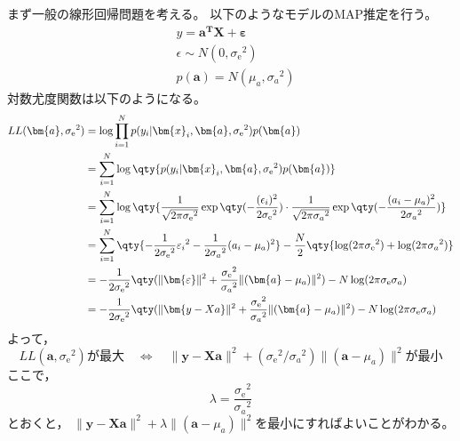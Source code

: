 \documentclass[class=jsarticle, crop=false, dvipdfmx, fleqn]{standalone}
\begin{document}
まず一般の線形回帰問題を考える。
以下のようなモデルのMAP推定を行う。
\begin{align}
& y = \bm{a^T X} + \bm{\varepsilon} \\
& \epsilon \sim N(0, {\sigma_\mathrm{e}}^2) \\
& p(\bm{a}) = N(\mu_a, {\sigma_a}^2)
\end{align}
対数尤度関数は以下のようになる。
\begin{align*}
LL(\bm{a}, {\sigma_\mathrm{e}}^2)
	& = \log \prod_{i=1}^{N} p(y_i | \bm{x}_i, \bm{a}, {\sigma_\mathrm{e}}^2) p(\bm{a}) \\
	& = \sum_{i=1}^{N} \log\qty{ p(y_i | \bm{x}_i, \bm{a}, {\sigma_\mathrm{e}}^2) p(\bm{a}) } \\
	& = \sum_{i=1}^{N} \log\qty{ \frac{1}{\sqrt{2 \pi {\sigma_\mathrm{e}}^2}} \exp\qty(-\frac{(\epsilon_i)^2}{2{\sigma_\mathrm{e}}^2}) \cdot
		\frac{1}{\sqrt{2 \pi {\sigma_a}^2}} \exp\qty(-\frac{(a_i - \mu_a)^2}{2{\sigma_a}^2}) } \\
	& = \sum_{i=1}^{N} \qty{ - \frac{1}{2{\sigma_\mathrm{e}}^2} {\varepsilon_i}^2 - \frac{1}{2{\sigma_a}^2} (a_i - \mu_a)^2} - \frac{N}{2} \qty{\log(2 \pi {\sigma_\mathrm{e}}^2) + \log(2 \pi {\sigma_a}^2)} \\
	& = -\frac{1}{2{\sigma_\mathrm{e}}^2} \qty(\|\bm{\varepsilon}\|^2 + \frac{{\sigma_\mathrm{e}}^2}{{\sigma_a}^2} \|(\bm{a} - \mu_a)\|^2) - N \log(2 \pi \sigma_\mathrm{e} \sigma_a) \\
	& = -\frac{1}{2{\sigma_\mathrm{e}}^2} \qty(\|\bm{y - Xa}\|^2 + \frac{{\sigma_\mathrm{e}}^2}{{\sigma_a}^2} \|(\bm{a} - \mu_a)\|^2) - N \log(2 \pi \sigma_\mathrm{e} \sigma_a)
\end{align*}
よって，
\begin{equation}
LL(\bm{a}, {\sigma_\mathrm{e}}^2) \text{が最大}
\quad \Leftrightarrow \quad
\|\bm{y - Xa}\|^2 + ({\sigma_\mathrm{e}}^2/{\sigma_a}^2) \|(\bm{a} - \mu_a)\|^2 \text{が最小}
\end{equation}
ここで，
\begin{equation}
\lambda = \frac{{\sigma_\mathrm{e}}^2}{{\sigma_a}^2}
\end{equation}
とおくと，
$\|\bm{y - Xa}\|^2 + \lambda \|(\bm{a} - \mu_a)\|^2$を最小にすればよいことがわかる。
\end{document}
